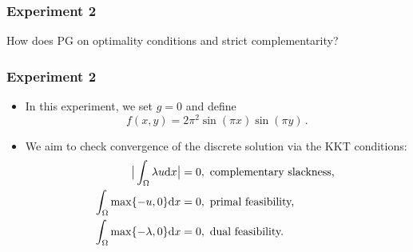 \documentclass[aspectratio=169,xcolor=dvipsnames,11pt]{beamer}
\newcommand{\dd}{\mathrm{d}}
\begin{document}
\begin{frame}\frametitle{Experiment 2}
\begin{center}
{\color{Maroon} \Large How does PG on optimality conditions and strict complementarity?}
\end{center}
\end{frame}

\begin{frame}\frametitle{Experiment 2}
\begin{itemize}
\item In this experiment, we set $g = 0$ and define 
\begin{equation}
\label{eq:StrictComplementarity_RHS}
	f(x,y)
	=
	2 \pi^2 \sin(\pi x)\sin(\pi y)
	\,.
\end{equation}
\item We aim to check convergence of the discrete solution via the KKT conditions:
 \[
 \aligned
 \big|\int_{\Omega} \lambda u \dd x\big| &= 0, \text{ complementary slackness, }\\
 \int_{\Omega} \max\{-u,0\} \dd x &= 0, \text{ primal feasibility, }\\
 \int_{\Omega} \max\{-\lambda,0\} \dd x &= 0, \text{ dual feasibility.}
 \endaligned
 \]

\end{itemize}
\end{frame}
\end{document}
